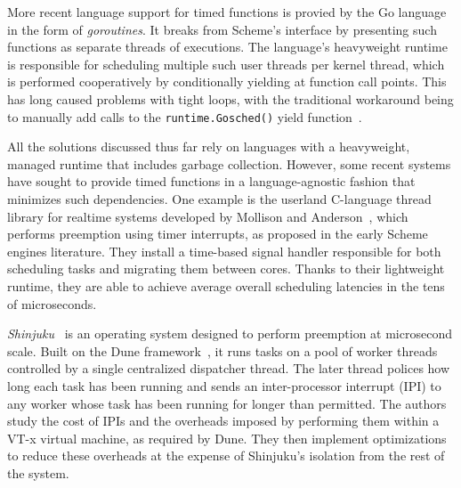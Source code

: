 
More recent language support for timed functions is provied by the Go
language~\cite{www-golang} in the form of \textit{goroutines}.  It breaks from
Scheme's interface by presenting such functions as separate threads of executions.
The language's heavyweight runtime is responsible for scheduling multiple such user
threads per kernel thread, which is performed cooperatively by conditionally yielding
at function call points.  This has long caused problems with tight loops, with the
traditional workaround being to manually add calls to the \texttt{runtime.Gosched()}
yield function~\cite{www-golang-tightloop}.


All the solutions discussed thus far rely on languages with a heavyweight, managed
runtime that includes garbage collection.  However, some recent systems have sought
to provide timed functions in a language-agnostic fashion that minimizes such
dependencies.  One example is the userland C-language thread library for realtime
systems developed by Mollison and Anderson~\cite{mollison:rtas2013}, which performs
preemption using timer interrupts, as proposed in the early Scheme engines
literature.  They install a time-based signal handler responsible for both scheduling
tasks and migrating them between cores.  Thanks to their lightweight runtime, they
are able to achieve average overall scheduling latencies in the tens of microseconds.


\textit{Shinjuku}~\cite{Kaffes:nsdi2019} is an operating system designed to perform
preemption at microsecond scale.  Built on the Dune framework~\cite{Belay:osdi2012},
it runs tasks on a pool of worker threads controlled by a single centralized
dispatcher thread.  The later thread polices how long each task has been running and
sends an inter-processor interrupt (IPI) to any worker whose task has been running
for longer than permitted.  The authors study the cost of IPIs and the overheads
imposed by performing them within a VT-x virtual machine, as required by Dune.  They
then implement optimizations to reduce these overheads at the expense of Shinjuku's
isolation from the rest of the system.

